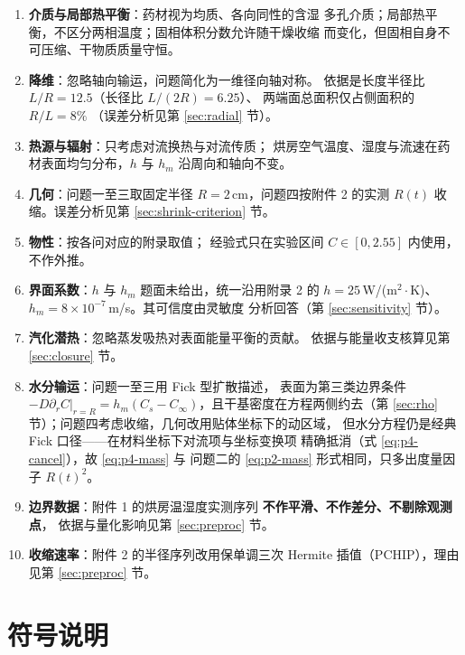 \documentclass[12pt,a4paper,fontset=none]{ctexart}
\begin{document}
\begin{enumerate}
  \item[(A1)] \textbf{介质与局部热平衡}：药材视为均质、各向同性的含湿
        多孔介质；局部热平衡，不区分两相温度；固相体积分数允许随干燥收缩
        而变化，但固相自身不可压缩、干物质质量守恒。
  \item[(A2)] \textbf{降维}：忽略轴向输运，问题简化为一维径向轴对称。
        依据是长度半径比 $L/R=12.5$（长径比 $L/(2R)=6.25$）、
        两端面总面积仅占侧面积的 $R/L=8\%$
        （误差分析见第 \ref{sec:radial} 节）。
  \item[(A3)] \textbf{热源与辐射}：只考虑对流换热与对流传质\cite{ref-wang}；
        烘房空气温度、湿度与流速在药材表面均匀分布，$h$ 与 $h_m$ 沿周向和轴向不变。
  \item[(A4)] \textbf{几何}：问题一至三取固定半径 $R=2$\,cm，问题四按附件 2 的实测
        $R(t)$ 收缩。误差分析见第
        \ref{sec:shrink-criterion} 节。
  \item[(A5)] \textbf{物性}：按各问对应的附录取值；
        经验式只在实验区间 $C\in[0,2.55]$ 内使用，不作外推。
  \item[(A6)] \textbf{界面系数}：$h$ 与 $h_m$ 题面未给出，统一沿用附录 2 的
        $h=25$\,W/(m$^2\cdot$K)、$h_m=8\times10^{-7}$\,m/s。其可信度由灵敏度
        分析回答（第 \ref{sec:sensitivity} 节）。
  \item[(A7)] \textbf{汽化潜热}：忽略蒸发吸热对表面能量平衡的贡献。
        依据与能量收支核算见第 \ref{sec:closure} 节。
  \item[(A8)] \textbf{水分输运}：问题一至三用 Fick 型扩散描述\cite{ref-crank}，
        表面为第三类边界条件 $-D\left.\partial_rC\right|_{r=R}
        =h_m(C_s-C_\infty)$，且干基密度在方程两侧约去（第
        \ref{sec:rho} 节）；问题四考虑收缩，几何改用贴体坐标下的动区域，
        但水分方程仍是经典 Fick 口径——在材料坐标下对流项与坐标变换项
        精确抵消（式 \eqref{eq:p4-cancel}），故 \eqref{eq:p4-mass} 与
        问题二的 \eqref{eq:p2-mass} 形式相同，只多出度量因子 $R(t)^2$。
  \item[(A9)] \textbf{边界数据}：附件 1 的烘房温湿度实测序列
        \textbf{不作平滑、不作差分、不剔除观测点}，
        依据与量化影响见第 \ref{sec:preproc} 节。
  \item[(A10)] \textbf{收缩速率}：附件 2 的半径序列改用保单调三次 Hermite
        插值（PCHIP），理由见第
        \ref{sec:preproc} 节。
\end{enumerate}

\section{符号说明}
\end{document}
